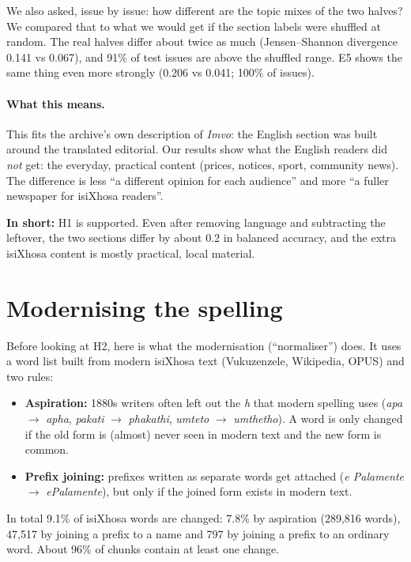 \documentclass[11pt,a4paper]{article}
\newcommand{\takeaway}[1]{\par\smallskip\noindent\colorbox{black!6}{\parbox{\dimexpr\linewidth-2\fboxsep}{\textbf{In short:} #1}}\par\smallskip}
\begin{document}
We also asked, issue by issue: how different are the topic mixes of the two halves? We compared that
to what we would get if the section labels were shuffled at random. The real halves differ about
twice as much (Jensen--Shannon divergence 0.141 vs 0.067), and 91\% of test issues are above the
shuffled range. E5 shows the same thing even more strongly (0.206 vs 0.041; 100\% of issues).

\paragraph{What this means.} This fits the archive's own description of \emph{Imvo}: the English section was
built around the translated editorial. Our results show what the English readers did \emph{not} get:
the everyday, practical content (prices, notices, sport, community news). The difference is less ``a
different opinion for each audience'' and more ``a fuller newspaper for isiXhosa readers''.

\takeaway{H1 is supported. Even after removing language and subtracting the leftover, the two sections
differ by about 0.2 in balanced accuracy, and the extra isiXhosa content is mostly practical, local
material.}

\section{Modernising the spelling}
Before looking at H2, here is what the modernisation (``normaliser'') does. It uses a word list built
from modern isiXhosa text (Vukuzenzele, Wikipedia, OPUS) and two rules:
\begin{itemize}
  \item \textbf{Aspiration:} 1880s writers often left out the \emph{h} that modern spelling uses
  (\emph{apa} $\to$ \emph{apha}, \emph{pakati} $\to$ \emph{phakathi}, \emph{umteto} $\to$
  \emph{umthetho}). A word is only changed if the old form is (almost) never seen in modern text
  and the new form is common.
  \item \textbf{Prefix joining:} prefixes written as separate words get attached
  (\emph{e Palamente} $\to$ \emph{ePalamente}), but only if the joined form exists in modern text.
\end{itemize}
In total 9.1\% of isiXhosa words are changed: 7.8\% by aspiration (289{,}816 words), 47{,}517 by
joining a prefix to a name and 797 by joining a prefix to an ordinary word. About 96\% of chunks
contain at least one change.
\end{document}
